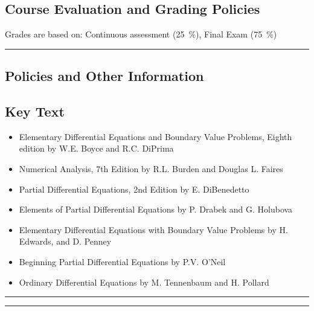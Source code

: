 \subsection*{Course Evaluation and Grading Policies}
Grades are based on:
Continuous assessment (\qty{25}{\percent}),
Final Exam (\qty{75}{\percent})
\vspace{2ex}\hrule\vspace{2ex}



\subsection*{Policies and Other Information}
\subsection*{Key Text}
\begin{itemize}
    \item Elementary Differential Equations and Boundary Value Problems, Eighth edition by  W.E. Boyce and  R.C. DiPrima
    \item Numerical Analysis, 7th Edition by R.L. Burden and Douglas L. Faires
    \item Partial Differential Equations, 2nd Edition by E. DiBenedetto
    \item Elements of Partial Differential Equations by P. Drabek and G. Holubova
    \item Elementary Differential Equations with Boundary Value Problems by H. Edwards, and D. Penney
    \item Beginning Partial Differential Equations by P.V. O’Neil
    \item Ordinary Differential Equations by M. Tennenbaum and H. Pollard
\end{itemize}
\vspace{2ex}\hrule
\vspace{2ex}\hrule\vspace{2ex}